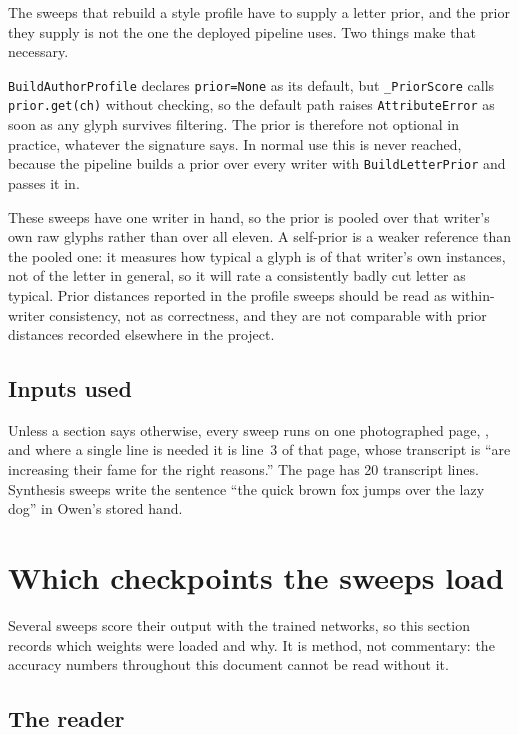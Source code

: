 \documentclass[11pt,a4paper]{article}
\begin{document}
The sweeps that rebuild a style profile have to supply a letter prior, and the
prior they supply is not the one the deployed pipeline uses. Two things make
that necessary.

\texttt{BuildAuthorProfile} declares \texttt{prior=None} as its default, but
\texttt{\_PriorScore} calls \texttt{prior.get(ch)} without checking, so the
default path raises \texttt{AttributeError} as soon as any glyph survives
filtering. The prior is therefore not optional in practice, whatever the
signature says. In normal use this is never reached, because the pipeline builds
a prior over every writer with \texttt{BuildLetterPrior} and passes it in.

These sweeps have one writer in hand, so the prior is pooled over that writer's
own raw glyphs rather than over all eleven. A self-prior is a weaker reference
than the pooled one: it measures how typical a glyph is of that writer's own
instances, not of the letter in general, so it will rate a consistently badly
cut letter as typical. Prior distances reported in the profile sweeps should be
read as within-writer consistency, not as correctness, and they are not
comparable with prior distances recorded elsewhere in the project.

\subsection{Inputs used}

Unless a section says otherwise, every sweep runs on one photographed page,
, and where a single line is
needed it is line~3 of that page, whose transcript is \enquote{are increasing
their fame for the right reasons.} The page has 20 transcript lines. Synthesis
sweeps write the sentence \enquote{the quick brown fox jumps over the lazy dog}
in Owen's stored hand.

\section{Which checkpoints the sweeps load}
\label{sec:defects}

Several sweeps score their output with the trained networks, so this section
records which weights were loaded and why. It is method, not commentary: the
accuracy numbers throughout this document cannot be read without it.

\subsection{The reader}
\end{document}
